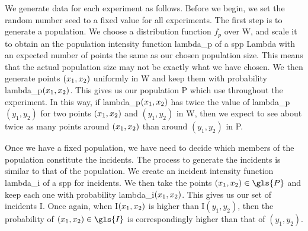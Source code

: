 We generate data for each experiment as follows.
Before we begin, we set the random number seed to a fixed value for all experiments.
The first step is to generate a population.
We choose a distribution function $f_p$ over \gls{W}, and scale it to obtain an the population intensity function \gls{lambda_p} of a \gls{spp} \gls{Lambda} with an expected number of points the same as our chosen population size.
This means that the actual population size may not be exactly what we have chosen.
We then generate points $(x_1, x_2)$ uniformly in \gls{W} and keep them with probability \gls{lambda_p}$(x_1, x_2)$.
This gives us our population \gls{P} which use throughout the experiment.
In this way,
if \gls{lambda_p}$(x_1, x_2)$ has twice the value of \gls{lambda_p}$(y_1, y_2)$ for two points $(x_1, x_2)$ and $(y_1, y_2)$ in \gls{W},
then we expect to see about twice as many points around $(x_1, x_2)$ than around $(y_1, y_2)$ in \gls{P}.

Once we have a fixed population, we have need to decide which members of the population constitute the incidents.
The process to generate the incidents is similar to that of the population.
We create an incident intensity function \gls{lambda_i} of a \gls{spp} for incidents.
We then take the points $\xvec \in \gls{P}$ and keep each one with probability \gls{lambda_i}$(x_1, x_2)$.
This gives us our set of incidents \gls{I}.
Once again, when \gls{I}$(x_1, x_2)$ is higher than \gls{I}$(y_1, y_2)$,
then the probability of $\xvec \in \gls{I}$ is correspondingly higher than that of $(y_1, y_2)$.